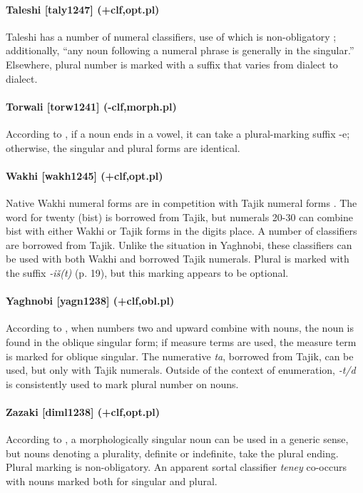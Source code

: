 \paragraph{Taleshi [taly1247] (+clf,opt.pl)}
Taleshi has a number of numeral classifiers, use of which is non-obligatory \citep[181-2]{Paul2011}; additionally, ``any noun following a numeral phrase is generally in the singular.'' Elsewhere, plural number is marked with a suffix that varies from dialect to dialect.
\paragraph{Torwali [torw1241] (-clf,morph.pl)}
According to \citet[34]{Grierson1929}, if a noun ends in a vowel, it can take a plural-marking suffix -e; otherwise, the singular and plural forms are identical.
\paragraph{Wakhi [wakh1245] (+clf,opt.pl)}
Native Wakhi numeral forms are in competition with Tajik numeral forms \citep[89-90]{GruenbergSteblinKamenskij1988}. The word for twenty (bist) is borrowed from Tajik, but numerals 20-30 can combine bist with either Wakhi or Tajik forms in the digits place. A number of classifiers are borrowed from Tajik. Unlike the situation in Yaghnobi, these classifiers can be used with both Wakhi and borrowed Tajik numerals. Plural is marked with the suffix {\it -i\v{s}(t)} (p. 19), but this marking appears to be optional.
\paragraph{Yaghnobi [yagn1238] (+clf,obl.pl)}
According to \citet[21--2]{Xromov1972}, when numbers two and upward combine with nouns, the noun is found in the oblique singular form; if measure terms are used, the measure term is marked for oblique singular. The numerative {\it ta}, borrowed from Tajik, can be used, but only with Tajik numerals. Outside of the context of enumeration, {\it -t/d} is consistently used to mark plural number on nouns.
\paragraph{Zazaki [diml1238] (+clf,opt.pl)}
According to \citet[19ff.]{Paul1998}, a morphologically singular noun can be used in a generic sense, but nouns denoting a plurality, definite or indefinite, take the plural ending. Plural marking is non-obligatory. An apparent sortal classifier {\it teney} co-occurs with nouns marked both for singular and plural.
